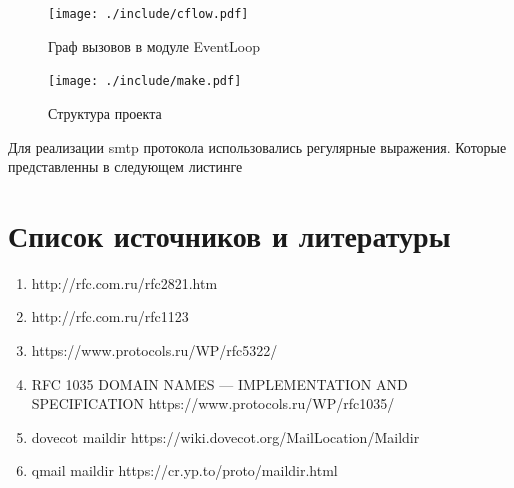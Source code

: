 \documentclass[a4paper,12pt]{report}
\makeatletter
\def\redeflsection{\def\l@section{\@dottedtocline{1}{0em}{10em}}}
\renewcommand{\appendix}{\par%
  \setcounter{section}{0}%
  \setcounter{subsection}{0}%
  \renewcommand{\appendixname}{ПРИЛОЖЕНИЕ}%
  \def\sectionname{\appendixname}%
  \addtocontents{toc}{\protect\redeflsection}%
  \gdef\thesection{\appendixname\hspace{0.2cm}\@Asbuk\c@section}%
}
\makeatother
\begin{document}
	
	\begin{figure}
	\centering
	\texttt{[image: ./include/cflow.pdf]}
	\caption{Граф вызовов в модуле EventLoop}
	\label{fig:event}
	\end{figure}

	\begin{figure}
	\centering
	\texttt{[image: ./include/make.pdf]}
	\caption{Структура проекта}
	\label{fig:make_server}
	\end{figure}

	Для реализации smtp протокола использовались регулярные выражения. Которые представленны в следующем листинге
	

	\section{Список источников и литературы}
	\begin{enumerate}
		\item http://rfc.com.ru/rfc2821.htm
		\item http://rfc.com.ru/rfc1123
		\item https://www.protocols.ru/WP/rfc5322/
		\item RFC 1035 DOMAIN NAMES — IMPLEMENTATION AND SPECIFICATION  https://www.protocols.ru/WP/rfc1035/
		\item dovecot maildir https://wiki.dovecot.org/MailLocation/Maildir
		\item qmail maildir https://cr.yp.to/proto/maildir.html
	\end{enumerate}
	
	\newpage
	\appendix
\end{document}
